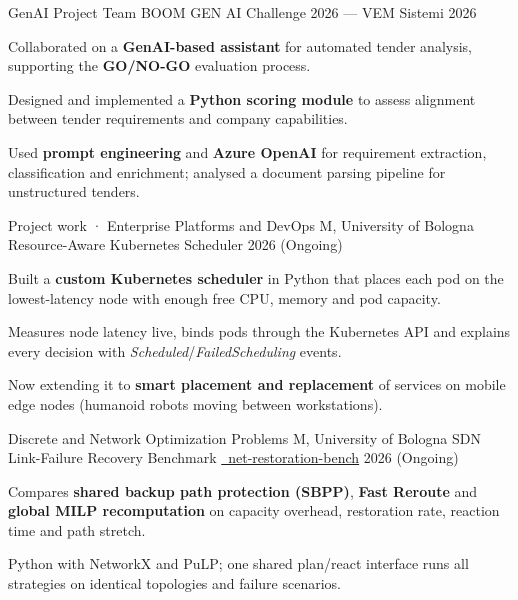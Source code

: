 \documentclass[11pt, a4paper]{../awesome-cv}
\begin{document}
\begin{cventries}
  \cventry
    {GenAI Project Team}
    {BOOM GEN AI Challenge 2026 — VEM Sistemi}
    {}
    {2026}
    {
      \begin{cvitems}
        \item {Collaborated on a \textbf{GenAI-based assistant} for automated tender analysis, supporting the \textbf{GO/NO-GO} evaluation process.}
        \item {Designed and implemented a \textbf{Python scoring module} to assess alignment between tender requirements and company capabilities.}
        \item {Used \textbf{prompt engineering} and \textbf{Azure OpenAI} for requirement extraction, classification and enrichment; analysed a document parsing pipeline for unstructured tenders.}
      \end{cvitems}
    }

  \cventry
    {Project work · Enterprise Platforms and DevOps M, University of Bologna}
    {Resource-Aware Kubernetes Scheduler}
    {}
    {2026 (Ongoing)}
    {
      \begin{cvitems}
        \item {Built a \textbf{custom Kubernetes scheduler} in Python that places each pod on the lowest-latency node with enough free CPU, memory and pod capacity.}
        \item {Measures node latency live, binds pods through the Kubernetes API and explains every decision with \textit{Scheduled}/\textit{FailedScheduling} events.}
        \item {Now extending it to \textbf{smart placement and replacement} of services on mobile edge nodes (humanoid robots moving between workstations).}
      \end{cvitems}
    }

  \cventry
    {Discrete and Network Optimization Problems M, University of Bologna}
    {SDN Link-Failure Recovery Benchmark}
    {\href{https://github.com/frigori/net-restoration-bench}{\faGithub\ net-restoration-bench}}
    {2026 (Ongoing)}
    {
      \begin{cvitems}
        \item {Compares \textbf{shared backup path protection (SBPP)}, \textbf{Fast Reroute} and \textbf{global MILP recomputation} on capacity overhead, restoration rate, reaction time and path stretch.}
        \item {Python with NetworkX and PuLP; one shared plan/react interface runs all strategies on identical topologies and failure scenarios.}
      \end{cvitems}
    }


\end{cventries}
\end{document}
